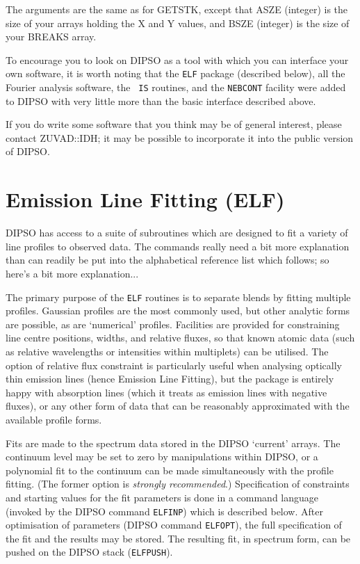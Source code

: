 The arguments are the same as for GETSTK, except that ASZE (integer)
is the size of your arrays holding the X and Y values, and BSZE
(integer) is the size of your BREAKS array.

To encourage you to look on DIPSO as a tool with which you can
interface your own software, it is worth noting that the {\tt ELF}
package (described below), all the Fourier analysis software, the {\tt
IS} routines, and the {\tt NEBCONT} facility were added to DIPSO with
very little more than the basic interface described above.

If you do write some software that you think may be of general
interest, please contact ZUVAD::IDH; it may be possible to incorporate
it into the public version of DIPSO.

\section {Emission Line Fitting (ELF)}

DIPSO has access to a suite of subroutines which are designed to fit a
variety of line profiles to observed data. The commands really need a
bit more explanation than can readily be put into the alphabetical
reference list which follows;  so here's a bit more explanation...

The primary purpose of the {\tt ELF} routines is to separate blends by
fitting multiple profiles. Gaussian profiles are the most commonly
used, but other analytic forms are possible, as are `numerical'
profiles. Facilities are provided for constraining line centre
positions, widths, and relative fluxes, so that known atomic data
(such as relative wavelengths or intensities within multiplets) can be
utilised. The option of relative flux constraint is particularly
useful when analysing optically thin emission lines (hence Emission
Line Fitting), but the package is entirely happy with absorption lines
(which it treats as emission lines with negative fluxes), or any other
form of data that can be reasonably approximated with the available
profile forms.

Fits are made to the spectrum data stored in the DIPSO `current'
arrays. The continuum level may be set to zero by manipulations within
DIPSO, or a polynomial fit to the continuum can be made simultaneously
with the profile fitting. (The former option is {\em strongly
recommended}.) Specification of constraints and starting values for
the fit parameters is done in a command language (invoked by the DIPSO
command {\tt ELFINP}) which is described below. After optimisation of
parameters (DIPSO command {\tt ELFOPT}), the full specification of the
fit and the results may be stored. The resulting fit, in spectrum
form, can be pushed on the DIPSO stack ({\tt ELFPUSH}).

